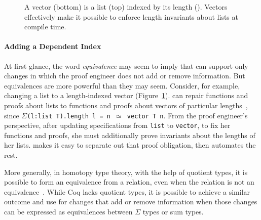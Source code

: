 \begin{figure}
\begin{minipage}{0.48\textwidth}
   
\end{minipage}
\hfill
\begin{minipage}{0.58\textwidth}
   
\end{minipage}
\vspace{-0.4cm}
\caption{A vector (bottom) is a list (top) indexed by its length (). Vectors effectively make it possible to enforce length invariants about lists at compile time.}
\label{fig:listtovect}
\end{figure}

\paragraph{Adding a Dependent Index}
At first glance, the word \textit{equivalence} may seem to imply that \toolnamec can support only changes in
which the proof engineer does not add or remove information.
But equivalences are more powerful than they may seem.
Consider, for example, changing a list to a length-indexed vector (Figure~\ref{fig:listtovect}).
\toolnamec can repair functions and proofs about lists to functions and proofs about vectors of particular lengths~\href{https://github.com/uwplse/pumpkin-pi/blob/v2.0.0/plugin/coq/examples/Example.v}{}, %
since $\Sigma$\lstinline{(l:list T).length l = n }$\simeq$\lstinline{ vector T n}.
From the proof engineer's perspective, after updating specifications from \lstinline{list} to \lstinline{vector},
to fix her functions and proofs, she must additionally prove invariants about the lengths of her lists.
\toolnamec makes it easy to separate out that proof obligation, then automates the rest.

More generally, in homotopy type theory, with the help of quotient types, it is possible to form an equivalence
from a relation, even when the relation is not an equivalence~\cite{angiuli2020internalizing}.
While Coq lacks quotient types,
it is possible to achieve a similar outcome and use \toolnamec for changes that add or remove information
when those changes can be expressed as equivalences between $\Sigma$ types or sum types.

